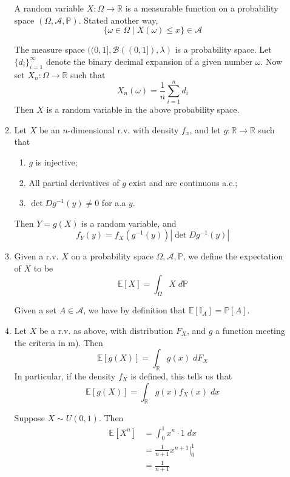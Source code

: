 \documentclass[pstricks, 11pt,a4paper]{article}
\theoremstyle{theorem}
\begin{document}
\begin{enumerate}
\begin{enumerate}
                  A random variable $X:\Omega\rightarrow\mathbb{R}$ is a measurable function on a probability space $(\Omega, \mathcal{A}, \mathbb{P})$. Stated another way,
                \[
                \{\omega\in\Omega\mid X(\omega)\leq x\}\in\mathcal{A}
                \]

                The measure space $((0, 1], \mathcal{B}((0, 1]), \lambda)$ is a probability space. Let $\{d_{i}\}_{i=1}^{\infty}$ denote the binary decimal expansion of a given number $\omega$. Now set $X_{n}:\Omega\rightarrow\mathbb{R}$ such that
                \[X_{n}(\omega)=\frac{1}{n}\sum_{i=1}^{n}d_{i}\]
                Then $X$ is a random variable in the above probability space.
          \item Let $X$ be an $n$-dimensional r.v. with density $f_{x}$, and let $g:\mathbb{R}\rightarrow\mathbb{R}$ such that
                \begin{enumerate}
                  \item $g$ is injective;
                  \item All partial derivatives of $g$ exist and are continuous a.e.;
                  \item $\det Dg^{-1}(y)\neq0$ for a.a $y$.
                \end{enumerate}
                Then $Y=g(X)$ is a random variable, and
                \[
                f_{Y}(y)=f_{X}(g^{-1}(y))|\det Dg^{-1}(y)|
                \]

          \item Given a r.v. $X$ on a probability space $\Omega, \mathcal{A}, \mathbb{P}$, we define the expectation of $X$ to be
                \[
                \mathbb{E}[X]=\int_{\Omega}X\;d\mathbb{P}
                \]

                Given a set $A\in\mathcal{A}$, we have by definition that $\mathbb{E}[\mathbb{I}_{A}]=\mathbb{P}[A]$.

          \item
                Let $X$ be a r.v. as above, with distribution $F_{X}$, and $g$ a function meeting the criteria in m). Then
                \[
                \mathbb{E}[g(X)]=\int_{\mathbb{R}}g(x)\;dF_{X}
                \]
                In particular, if the density $f_{X}$ is defined, this tells us that \[\mathbb{E}[g(X)]=\int_{\mathbb{R}}g(x)f_{X}(x)\;dx\]

                Suppose $X\sim U(0,1)$. Then
                \begin{align*}
                  \mathbb{E}[X^{n}] &= \int_{0}^{1}x^{n}\cdot 1\;dx \\
                                    &= \frac{1}{n+1}x^{n+1}\Big\rvert_{0}^{1} \\
                  &= \frac{1}{n+1}
                \end{align*}


\end{enumerate}
\end{enumerate}
\end{document}

